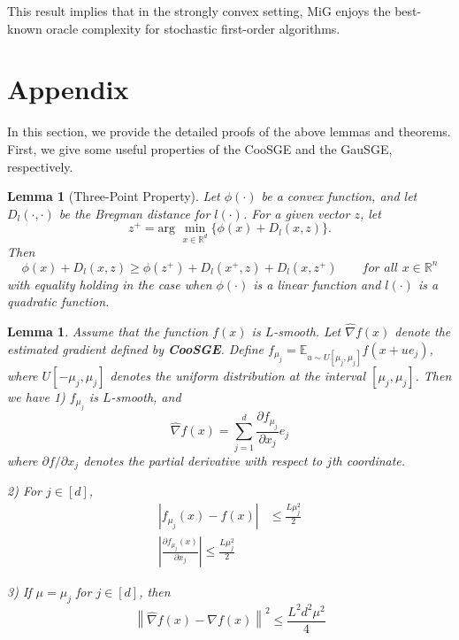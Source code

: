 \documentclass{article}
\newcommand*{\R}{\mathbb{R}}
\newcommand*{\E}{\mathbb{E}}
\newcommand{\norm}[1]{\left\lVert#1\right\rVert}
\newcommand{\abs}[1]{\left|#1\right|}
\newtheorem{lemma}[theorem]{Lemma}
\theoremstyle{definition}
\theoremstyle{remark}
\begin{document}
{\color{DarkOrchid}
This result implies that in the strongly convex setting, MiG enjoys the best-known oracle complexity for stochastic first-order algorithms.
}
\section{Appendix}
{\color{Green}
In this section, we provide the detailed proofs of the above lemmas and theorems. First, we give some useful properties of the CooSGE and the GauSGE, respectively.
}
\begin{lemma}[Three-Point Property] Let $\phi(\cdot)$ be a convex function, and let $D_{l}(\cdot,\cdot)$ be the Bregman distance for $l(\cdot)$. For a given vector $z$, let 
\[
z^+ = \text{arg}\,\,\min_{x\in\R^d}\{\phi(x)+D_{l}(x,z)\}.
\]
Then 
\begin{equation}
\phi(x) + D_l(x,z) \geq \phi(z^+) + D_l(x^+,z) + D_l(x,z^+)\qquad for\,\,all\,\,x\in\R^n
\end{equation}
with equality holding in the case when $\phi(\cdot)$ is a linear function and $l(\cdot)$ is a quadratic function.
\end{lemma}


\begin{lemma}\label{CooSGE}
Assume that the function $f(x)$ is $L$-smooth. Let $\hat{\nabla} f(x)$ denote the estimated gradient defined by {\bf CooSGE}. Define $f_{\mu_j} = \E_{u\sim U[\mu_j, \mu_j]} f(x+ue_j)$, where $U[-\mu_j,\mu_j]$ denotes the uniform distribution at the interval $[\mu_j, \mu_j]$. Then we have 
1) $f_{\mu_j}$ is $L$-smooth, and 
\begin{equation}
\hat{\nabla} f(x) = \sum_{j=1}^d \frac{\partial f_{\mu_j}}{\partial x_j}e_j
\end{equation} 
where $\partial f/\partial x_j$ denotes the partial derivative with respect to $j$th coordinate.

2) For $j\in [d]$, 
\begin{align}
\abs{f_{\mu_j}(x) - f(x)} &\leq \frac{L\mu_j^2}{2}\\
\abs{\frac{\partial f_{\mu_j}(x)}{\partial x_j}} \leq \frac{L\mu_j^2}{2}
\end{align}
 
 3) If $\mu = \mu_j$ for $j\in [d]$, then 
 \begin{equation}
 \norm{\hat{\nabla} f(x) - {\nabla} f(x)} ^2 \leq \frac{L^2 d^2 \mu^2}{4}
\end{equation}  
\end{lemma}
\end{document}
